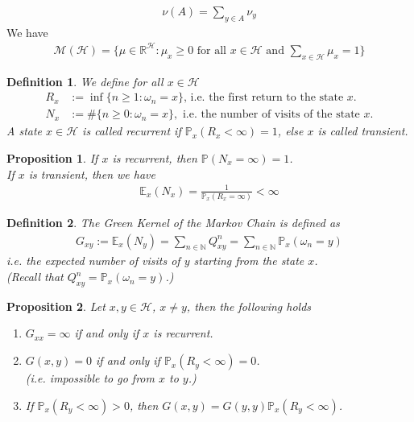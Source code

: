 \documentclass[11pt,a4paper, final]{article}
\newtheorem{prop}{Proposition}[section]
\newtheorem{defn}{Definition}[section]
\theoremstyle{definition}
\begin{document}
\begin{align*}
 \nu (A) = \sum_{y \in A} \nu_y 
\end{align*}
We have 
\begin{align*}
\mathcal{M}( \mathcal{H}) = \lbrace \mu \in \mathbb{R}^\mathcal{H} : \mu_x \geq 0 \text{ for all } x \in \mathcal{H} \text{ and } \sum_{x \in \mathcal{H}} \mu_x = 1 \rbrace 
\end{align*} 
\begin{defn} We define for all $x \in \mathcal{H}$
\begin{align*}
R_x &:= \inf \lbrace n \geq 1 : \omega_n = x \rbrace \text{, i.e. the first return to the state $x$.} \\
N_x &:= \# \lbrace n \geq 0 : \omega_n =x \rbrace, \text{ i.e. the number of visits of the state $x$.}
\end{align*}
A state $x \in \mathcal{H}$ is called recurrent if $\mathbb{P}_x ( R_x < \infty ) =1$, else $x$ is called transient. 
\end{defn}
\begin{prop} If $x$ is recurrent, then $\mathbb{P}(N_x = \infty) =1$. \\  If $x$ is transient, then we have 
\begin{align*}
\mathbb{E}_x ( N_x)= \frac{1}{\mathbb{P}_x(R_x = \infty)} < \infty 
\end{align*}
\end{prop}
\begin{defn} The Green Kernel of the Markov Chain is defined as
\begin{align*}
G_{xy}:= \mathbb{E}_x ( N_y) = \sum_{n \in \mathbb{N}} Q_{xy}^n = \sum_{n \in \mathbb{N}} \mathbb{P}_x ( \omega_n =y) 
\end{align*}
i.e. the expected number of visits of $y$ starting from the state $x$. \\ (Recall that $Q_{xy}^n = \mathbb{P}_x( \omega_n =y)$.)
\end{defn}
\newpage 
\begin{prop} Let $x,y \in \mathcal{H}$, $x \neq y$, then the following holds
\begin{enumerate}
\item $G_{xx}= \infty$ if and only if $x$ is recurrent.
\item $G(x,y)=0$ if and only if $\mathbb{P}_x (R_y < \infty) =0$. 
\\  (i.e. impossible to go from $x$ to $y$.)
\item If $\mathbb{P}_x( R_y < \infty) >0$, then $G(x,y)= G(y,y) \mathbb{P}_x( R_y < \infty)$.
\end{enumerate}
\end{prop}
\end{document}
